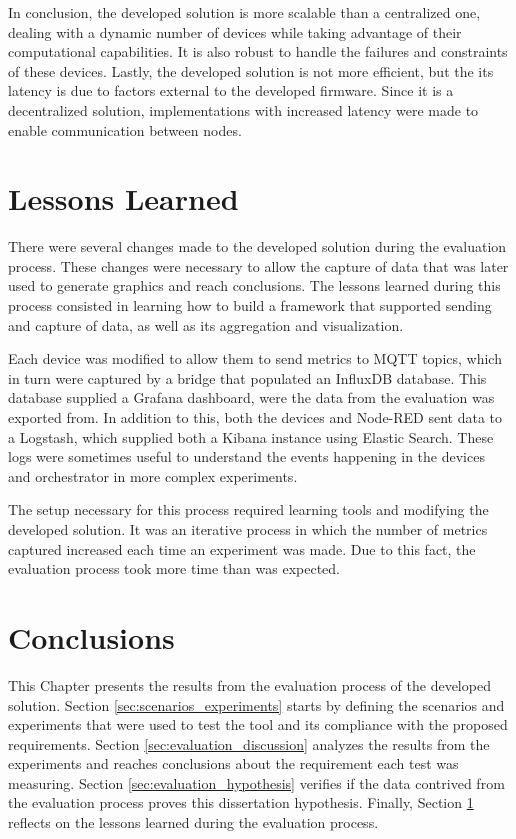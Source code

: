 In conclusion, the developed solution is more scalable than a centralized one, dealing with a dynamic number of devices while taking advantage of their computational capabilities. It is also robust to handle the failures and constraints of these devices. Lastly, the developed solution is not more efficient, but the its latency is due to factors external to the developed firmware. Since it is a decentralized solution, implementations with increased latency were made to enable communication between nodes.

\section{Lessons Learned}\label{sec:evaluation_lessons_learned}

There were several changes made to the developed solution during the evaluation process. These changes were necessary to allow the capture of data that was later used to generate graphics and reach conclusions. The lessons learned during this process consisted in learning how to build a framework that supported sending and capture of data, as well as its aggregation and visualization. 

Each device was modified to allow them to send metrics to MQTT topics, which in turn were captured by a bridge that populated an InfluxDB database. This database supplied a Grafana dashboard, were the data from the evaluation was exported from. In addition to this, both the devices and Node-RED sent data to a Logstash, which supplied both a Kibana instance using Elastic Search. These logs were sometimes useful to understand the events happening in the devices and orchestrator in more complex experiments.

The setup necessary for this process required learning tools and modifying the developed solution. It was an iterative process in which the number of metrics captured increased each time an experiment was made. Due to this fact, the evaluation process took more time than was expected.

\section{Conclusions}\label{sec:evaluation_conclusions}

This Chapter presents the results from the evaluation process of the developed solution. Section \ref{sec:scenarios_experiments} starts by defining the scenarios and experiments that were used to test the tool and its compliance with the proposed requirements. Section \ref{sec:evaluation_discussion} analyzes the results from the experiments and reaches conclusions about the requirement each test was measuring. Section \ref{sec:evaluation_hypothesis} verifies if the data contrived from the evaluation process proves this dissertation hypothesis. Finally, Section \ref{sec:evaluation_lessons_learned} reflects on the lessons learned during the evaluation process. 


